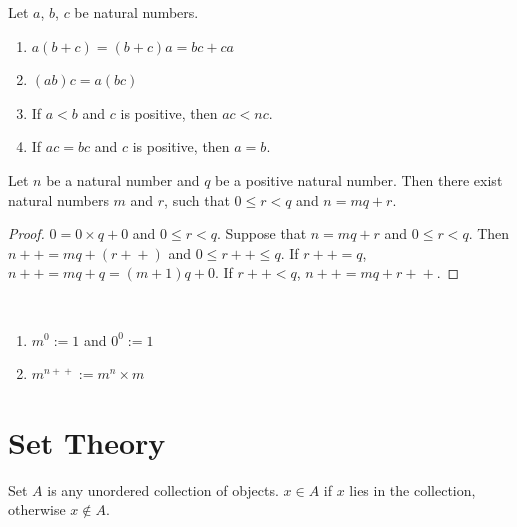 \documentclass{article}
\newcommand{\pp}{\!+\!+}
\begin{document}
\begin{proposition}
    Let $a$, $b$, $c$ be natural numbers.
    \begin{enumerate}
        \item $a(b+c)=(b+c)a=bc+ca$
        \item $(ab)c=a(bc)$
        \item If $a<b$ and $c$ is positive, then $ac<nc$.
        \item If $ac=bc$ and $c$ is positive, then $a=b$.
    \end{enumerate}
\end{proposition}

\begin{lemma}
    Let $n$ be a natural number and $q$ be a positive natural number. Then there exist natural numbers $m$ and $r$, such that $0 \leq r < q$ and $n=mq+r$.
\end{lemma}

\begin{proof}
    $0 = 0 \times q + 0$ and $0 \leq r < q$.
    Suppose that $n=mq+r$ and $0 \leq r < q$.
    Then $n\pp=mq+(r\pp)$ and $0 \leq r\pp \leq q$.
    If $r\pp=q$, $n\pp=mq+q=(m+1)q+0$.
    If $r\pp<q$, $n\pp=mq+r\pp$.
\end{proof}

\begin{definition}[Exponentiation]~
    \begin{enumerate}
        \item $m^{0}:=1$ and $0^{0}:=1$
        \item $m^{n\pp}:=m^{n} \times m$
    \end{enumerate}
\end{definition}

\section{Set Theory}
\begin{definition}
    Set $A$ is any unordered collection of objects.
    $x \in A$ if $x$ lies in the collection, otherwise $x \notin A$.
\end{definition}
\end{document}
